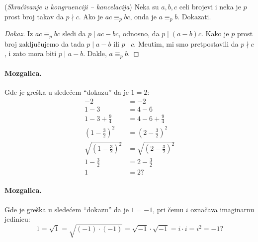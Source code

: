 \begin{EX}\label{ft05.ex.cong-c} (\textit{Skra\'civanje u kongruenciji -- kancelacija})
  Neka su $a, b, c$ celi brojevi i neka je $p$ prost broj takav da $p \nmid c$.
  Ako je $a c \equiv_p b c$, onda je $a \equiv_p b$. Dokazati.
\end{EX}
\begin{proof}[Dokaz]
  Iz $a c \equiv_p b c$ sledi da $p \mid a c - b c$, odnosno, da $p \mid (a - b) c$.
  Kako je $p$ prost broj zaklju\v cujemo da tada $p \mid a - b$ ili $p \mid c$.
  Me\dj utim, mi smo pretpostavili da $p \nmid c$, i zato mora biti $p \mid a - b$.
  Dakle, $a \equiv_p b$.
\end{proof}

\paragraph{Mozgalica.}
  Gde je gre\v ska u slede\'cem \enquote{dokazu} da je $1 = 2$:
  \begin{align*}
    -2 &= -2 \\
    1 - 3 &= 4 - 6 \\
    1 - 3 + \frac 94 &= 4 - 6 + \frac 94 \\
    \left(1 - \frac 32\right)^2 &= \left(2 - \frac 32\right)^2 \\
    \sqrt{\left(1 - \frac 32\right)^2} &= \sqrt{\left(2 - \frac 32\right)^2} \\
    1 - \frac 32 &= 2 - \frac 32 \\
    1 &= 2 ?
  \end{align*}


\paragraph{Mozgalica.}
  Gde je gre\v ska u slede\'cem \enquote{dokazu} da je $1 = -1$, pri \v cemu $i$ ozna\v cava imaginarnu jedinicu:
  $$
    1 = \sqrt{1} = \sqrt{(-1) \cdot (-1)} = \sqrt{-1} \cdot \sqrt{-1} = i \cdot i = i^2 = -1?
  $$

